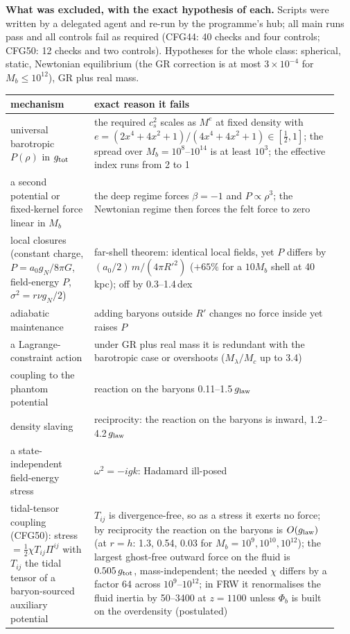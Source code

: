 \documentclass[10pt]{article}
\begin{document}
\textbf{What was excluded, with the exact hypothesis of each.} Scripts were written by a delegated agent and re-run by the programme's hub; all main runs pass and all controls fail as required (CFG44: 40 checks and four controls; CFG50: 12 checks and two controls). Hypotheses for the whole class: spherical, static, Newtonian equilibrium (the GR correction is at most $3\times10^{-4}$ for $M_b\le10^{12}$), GR plus real mass.
\begin{center}\small
\begin{tabular}{p{0.24\linewidth}p{0.70\linewidth}}
\toprule
mechanism & exact reason it fails \\
\midrule
universal barotropic $P(\rho)$ in $g_{\rm tot}$ & the required $c_s^2$ scales as $M^e$ at fixed density with $e=(2x^4+4x^2+1)/(4x^4+4x^2+1)\in[\tfrac12,1]$; the spread over $M_b=10^8$--$10^{14}$ is at least $10^3$; the effective index runs from 2 to 1 \\
a second potential or fixed-kernel force linear in $M_b$ & the deep regime forces $\beta=-1$ and $P\propto\rho^3$; the Newtonian regime then forces the felt force to zero \\
local closures (constant charge, $P=a_0g_N/8\pi G$, field-energy $P$, $\sigma^2=r\nu g_N/2$) & far-shell theorem: identical local fields, yet $P$ differs by $(a_0/2)\,m/(4\pi R'^2)$ ($+65\%$ for a $10M_b$ shell at 40\,kpc); off by 0.3--1.4\,dex \\
adiabatic maintenance & adding baryons outside $R'$ changes no force inside yet raises $P$ \\
a Lagrange-constraint action & under GR plus real mass it is redundant with the barotropic case or overshoots ($M_\lambda/M_c$ up to 3.4) \\
coupling to the phantom potential & reaction on the baryons 0.11--1.5\,$g_{\rm law}$ \\
density slaving & reciprocity: the reaction on the baryons is inward, 1.2--4.2\,$g_{\rm law}$ \\
a state-independent field-energy stress & $\omega^2=-igk$: Hadamard ill-posed \\
tidal-tensor coupling (CFG50): stress $=\tfrac12\chi T_{ij}\Pi^{ij}$ with $T_{ij}$ the tidal tensor of a baryon-sourced auxiliary potential & $T_{ij}$ is divergence-free, so as a stress it exerts no force; by reciprocity the reaction on the baryons is $O(g_{\rm law})$ (at $r=h$: 1.3, 0.54, 0.03 for $M_b=10^9,10^{10},10^{12}$); the largest ghost-free outward force on the fluid is $0.505\,g_{\rm tot}$, mass-independent; the needed $\chi$ differs by a factor 64 across $10^9$--$10^{12}$; in FRW it renormalises the fluid inertia by 50--3400 at $z=1100$ unless $\Phi_b$ is built on the overdensity (postulated) \\
\bottomrule
\end{tabular}
\end{center}
\end{document}
